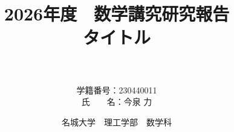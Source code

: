 \title{\LARGE 2026年度　数学講究研究報告\\\vspace{1.5cm}
タイトル\\
{\huge　\\} \vspace{7cm}}
\author{
 \LARGE
 \centering
  \begin{tabular}{ll}
   学籍番号：230440011 \\
   氏　　名：今泉 力
  \end{tabular}
}
\date{\vspace{1.5cm} \Large 名城大学　理工学部　数学科}
\pagestyle{empty}
\maketitle
